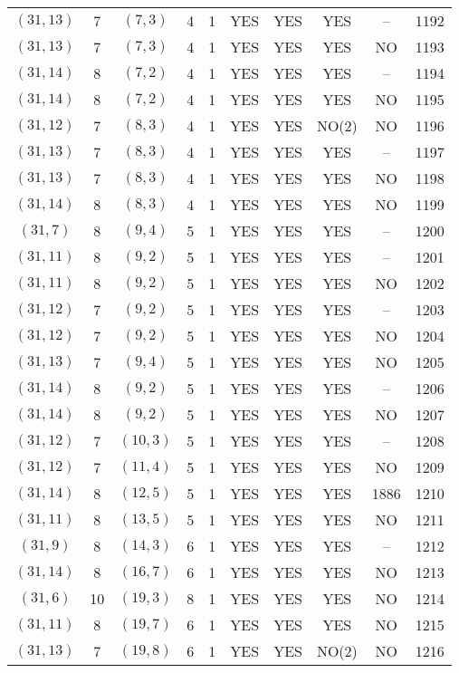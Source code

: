\begin{longtable}{|c|c|c|c|c|c|c|c|c|c|}
$(31, 13)$ & 7 & $(7, 3)$ & 4 & 1 & YES & YES & YES & -- & 1192\\
$(31, 13)$ & 7 & $(7, 3)$ & 4 & 1 & YES & YES & YES & NO & 1193\\
$(31, 14)$ & 8 & $(7, 2)$ & 4 & 1 & YES & YES & YES & -- & 1194\\
$(31, 14)$ & 8 & $(7, 2)$ & 4 & 1 & YES & YES & YES & NO & 1195\\
$(31, 12)$ & 7 & $(8, 3)$ & 4 & 1 & YES & YES & NO(2) & NO & 1196\\
$(31, 13)$ & 7 & $(8, 3)$ & 4 & 1 & YES & YES & YES & -- & 1197\\
$(31, 13)$ & 7 & $(8, 3)$ & 4 & 1 & YES & YES & YES & NO & 1198\\
$(31, 14)$ & 8 & $(8, 3)$ & 4 & 1 & YES & YES & YES & NO & 1199\\
$(31, 7)$ & 8 & $(9, 4)$ & 5 & 1 & YES & YES & YES & -- & 1200\\
$(31, 11)$ & 8 & $(9, 2)$ & 5 & 1 & YES & YES & YES & -- & 1201\\
$(31, 11)$ & 8 & $(9, 2)$ & 5 & 1 & YES & YES & YES & NO & 1202\\
$(31, 12)$ & 7 & $(9, 2)$ & 5 & 1 & YES & YES & YES & -- & 1203\\
$(31, 12)$ & 7 & $(9, 2)$ & 5 & 1 & YES & YES & YES & NO & 1204\\
$(31, 13)$ & 7 & $(9, 4)$ & 5 & 1 & YES & YES & YES & NO & 1205\\
$(31, 14)$ & 8 & $(9, 2)$ & 5 & 1 & YES & YES & YES & -- & 1206\\
$(31, 14)$ & 8 & $(9, 2)$ & 5 & 1 & YES & YES & YES & NO & 1207\\
$(31, 12)$ & 7 & $(10, 3)$ & 5 & 1 & YES & YES & YES & -- & 1208\\
$(31, 12)$ & 7 & $(11, 4)$ & 5 & 1 & YES & YES & YES & NO & 1209\\
$(31, 14)$ & 8 & $(12, 5)$ & 5 & 1 & YES & YES & YES & 1886 & 1210\\
$(31, 11)$ & 8 & $(13, 5)$ & 5 & 1 & YES & YES & YES & NO & 1211\\
$(31, 9)$ & 8 & $(14, 3)$ & 6 & 1 & YES & YES & YES & -- & 1212\\
$(31, 14)$ & 8 & $(16, 7)$ & 6 & 1 & YES & YES & YES & NO & 1213\\
$(31, 6)$ & 10 & $(19, 3)$ & 8 & 1 & YES & YES & YES & NO & 1214\\
$(31, 11)$ & 8 & $(19, 7)$ & 6 & 1 & YES & YES & YES & NO & 1215\\
$(31, 13)$ & 7 & $(19, 8)$ & 6 & 1 & YES & YES & NO(2) & NO & 1216\\

\end{longtable}
